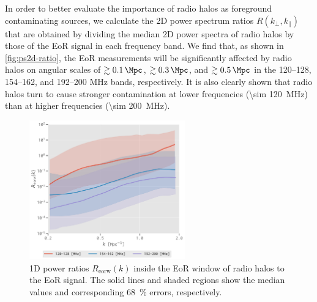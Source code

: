 \documentclass[modern]{aastex62}
\newcommand{\R}[1]{\mathrm{#1}}
\newcommand{\klos}{\text{$k_{\parallel}$}}
\newcommand{\kperp}{\text{$k_{\bot}$}}
\begin{document}
In order to better evaluate the importance of radio halos as foreground
contaminating sources, we calculate the 2D power spectrum ratios
$R(\kperp, \klos)$ that are obtained by dividing the median 2D power
spectra of radio halos by those of the EoR signal in each frequency band.
We find that, as shown in \autoref{fig:ps2d-ratio}, the EoR measurements
will be significantly affected by radio halos on angular scales of
$\gtrsim \SI{0.1}{\per\Mpc}$, $\gtrsim \SI{0.3}{\per\Mpc}$, and
$\gtrsim \SI{0.5}{\per\Mpc}$ in the \numrange{120}{128},
\numrange{154}{162}, and \numrange{192}{200} \si{\MHz} bands, respectively.
It is also clearly shown that radio halos turn to cause stronger
contamination at lower frequencies (\SI{\sim 120}{\MHz}) than at higher
frequencies (\SI{\sim 200}{\MHz}).

\begin{figure}
  \centering
  \includegraphics[width=0.6\textwidth]{ps1d-ratio-3bands}
  \caption{\label{fig:ps1d-ratio}%
    1D power ratios $R_{\R{eorw}}(k)$ inside the EoR window of
    radio halos to the EoR signal.
    The solid lines and shaded regions show the median values and
    corresponding \SI{68}{\percent} errors, respectively.
  }
\end{figure}
\end{document}
